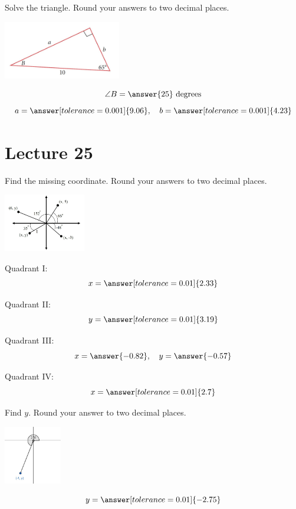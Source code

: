 \documentclass{ximera}
\begin{document}
\begin{problem}\label{prob:160hom10prob6}
Solve the triangle. Round your answers to two decimal places.
\begin{image}
   
\includegraphics[height=1in]{160H10pic4.jpg}~
 
\end{image}

$$\angle B=\answer{25}\mbox{ degrees}$$
$$a=\answer[tolerance=0.001]{9.06},\quad b=\answer[tolerance=0.001]{4.23}$$
\end{problem}

\section{Lecture 25}

\begin{problem}\label{prob:160hom10prob7}
Find the missing coordinate.  Round your answers to two decimal places.
\begin{image}
   
\includegraphics[height=1in]{160H10pic2.jpg}~
 
\end{image}

Quadrant I:
$$x=\answer[tolerance=0.01]{2.33}$$

Quadrant II:
$$y=\answer[tolerance=0.01]{3.19}$$

Quadrant III:
$$x=\answer{-0.82},\quad y=\answer{-0.57}$$

Quadrant IV:
$$x=\answer[tolerance=0.01]{2.7}$$
\end{problem}

\begin{problem}\label{prob:160hom10prob8}
Find $y$.  Round your answer to two decimal places.
 
 \begin{image}
   
\includegraphics[height=1in]{160H10pic1.jpg}

\end{image}
$$y=\answer[tolerance=0.01]{-2.75}$$
\end{problem}
\end{document}
